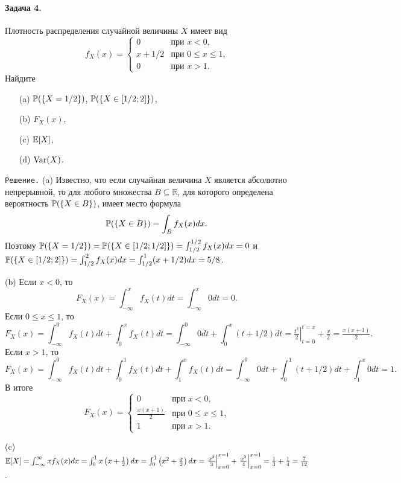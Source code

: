 \documentclass[12pt, a4paper]{article}\usepackage[]{graphicx}\usepackage[]{color}
\begin{document}
\paragraph{Задача 4.}
Плотность распределения случайной величины $X$ имеет вид
\[
f_X(x) =          \begin{cases}
                     0     &   \text{при $x < 0$,} \\
                     x + 1/2   &   \text{при $0 \leq x \leq 1$,} \\
                     0     &   \text{при $x > 1$.}
                  \end{cases}
\]
Найдите
\begin{itemize}
  \item[(a)] $\P(\{X=1/2\})$, $\P(\{X \in [1/2;2]\})$,
  \item[(b)] $F_X(x)$,
  \item[(c)] $\E[X]$,
  \item[(d)] $\Var(X)$.
\end{itemize}

\verb"Решение." (a) Известно, что если случайная величина $X$ является абсолютно непрерывной, то для любого множества $B \subseteq \mathbb{R}$, для которого определена вероятность $\P(\{X \in B\})$, имеет место формула
\[
\P(\{X \in B\}) = \int_{B}f_X(x)dx \text{.}
\]
Поэтому $\P(\{X = 1/2\}) = \P(\{X \in [1/2;1/2]\}) = \int_{1/2}^{1/2}f_X(x)dx = 0$ и $\P(\{X \in [1/2;2]\}) = \int_{1/2}^{2}f_X(x)dx = \int_{1/2}^{1}(x+1/2)dx =5/8$.

(b) Если $x < 0$, то
\[
F_X(x) = \int_{-\infty}^{x}f_X(t)dt = \int_{-\infty}^{x}0dt = 0 \text{.}
\]
Если $0 \leq x \leq 1$, то
\[
F_X(x) = \int_{-\infty}^{0}f_X(t)dt + \int_{0}^{x}f_X(t)dt= \int_{-\infty}^{0}0dt + \int_{0}^{x}(t+1/2)dt = \left.\tfrac{t^2}{2}\right|_{t=0}^{t=x} + \tfrac{x}{2} = \tfrac{x(x+1)}{2} \text{.}
\]
Если $x > 1$, то
\[
F_X(x) = \int_{-\infty}^{0}f_X(t)dt + \int_{0}^{1}f_X(t)dt + \int_{1}^{x}f_X(t)dt = \int_{-\infty}^{0}0dt + \int_{0}^{1}(t+1/2)dt + \int_{1}^{x}0dt = 1 \text{.}
\]
В итоге
\[
F_X(x) =
                 \begin{cases}
                     0                   &   \text{при $x < 0$,} \\
                     \tfrac{x(x+1)}{2}   &   \text{при $0 \leq x \leq 1$,} \\
                     1                   &   \text{при $x > 1$.}
                  \end{cases}
\]

(c) $\E[X] = \int_{-\infty}^{\infty}xf_X(x)dx = \int_{0}^{1}x\left(x+\tfrac{1}{2}\right)dx = \int_{0}^{1}\left(x^2+\tfrac{x}{2}\right)dx = \left.\tfrac{x^3}{3}\right|_{x=0}^{x=1} + \left.\tfrac{x^2}{4}\right|_{x=0}^{x=1} = \tfrac{1}{3} + \tfrac{1}{4} = \tfrac{7}{12}$.
\end{document}
